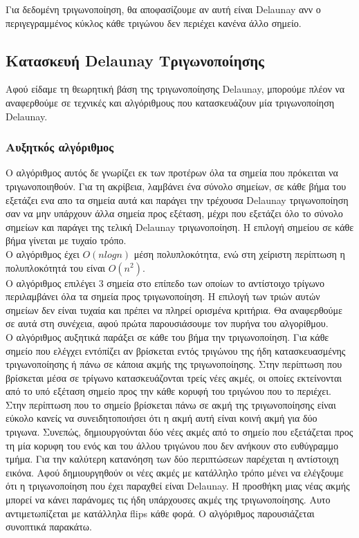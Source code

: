 \documentclass[oneside,12pt]{book}
\theoremstyle{definition}
\begin{document}
Για δεδομένη τριγωνοποίηση, θα αποφασίζουμε αν αυτή είναι Delaunay ανν ο περιγεγραμμένος κύκλος κάθε τριγώνου δεν περιέχει κανένα άλλο σημείο. \\

\subsection{Κατασκευή Delaunay Τριγωνοποίησης}

Αφού είδαμε τη θεωρητική βάση της τριγωνοποίησης Delaunay, μπορούμε πλέον να αναφερθούμε σε τεχνικές και αλγόριθμους που κατασκευάζουν μία τριγωνοποίηση Delaunay. \\

\subsubsection{Αυξητκός αλγόριθμος}

Ο αλγόριθμος αυτός δε γνωρίζει εκ των προτέρων όλα τα σημεία που πρόκειται να τριγωνοποιηθούν. Για τη ακρίβεια, λαμβάνει ένα σύνολο σημείων, σε κάθε βήμα του εξετάζει ενα απο τα σημεία αυτά και παράγει την τρέχουσα Delaunay τριγωνοποίηση σαν να μην υπάρχουν άλλα σημεία προς εξέταση, μέχρι που εξετάζει όλο το σύνολο σημείων και παράγει της τελική Delaunay τριγωνοποίηση. Η επιλογή σημείου σε κάθε βήμα γίνεται με τυχαίο τρόπο. \\

Ο αλγόριθμος έχει \(Ο(n logn)\) μέση πολυπλοκότητα, ενώ στη χείριστη περίπτωση η πολυπλοκότητά του είναι \(O(n^2)\). \\

Ο αλγόριθμος επιλέγει 3 σημεία στο επίπεδο των οποίων το αντίστοιχο τρίγωνο περιλαμβάνει όλα τα σημεία προς τριγωνοποίηση. Η επιλογή των τριών αυτών σημείων δεν είναι τυχαία και πρέπει να πληρεί ορισμένα κριτήρια. Θα αναφερθούμε σε αυτά στη συνέχεια, αφού πρώτα παρουσιάσουμε τον πυρήνα του αλγορίθμου. \\

Ο αλγόριθμος αυξητικά παράξει σε κάθε του βήμα την τριγωνοποίηση. Για κάθε σημείο που ελέγχει εντόπίζει αν βρίσκεται εντός τριγώνου της ήδη κατασκευασμένης τριγωνοποίησης ή πάνω σε κάποια ακμής της τριγωνοποίησης. Στην περίπτωση που βρίσκεται μέσα σε τρίγωνο κατασκευάζονται τρείς νέες ακμές, οι οποίες εκτείνονται από το υπό εξέταση σημείο προς την κάθε κορυφή του τριγώνου που το περιέχει. Στην περίπτωση που το σημείο βρίσκεται πάνω σε ακμή της τριγωνοποίησης είναι εύκολο κανείς να συνειδητοποιήσει ότι η ακμή αυτή είναι κοινή ακμή για δύο τριγωνα. Συνεπώς, δημιουργούνται δύο νέες ακμές από το σημείο που εξετάζεται προς τη μία κορυφη του ενός και του άλλου τριγώνου που δεν ανήκουν στο ευθύγραμμο τμήμα. Για την καλύτερη κατανόηση των δύο περιπτώσεων παρέχεται η αντίστοιχη εικόνα. Αφού δημιουργηθούν οι νέες ακμές με κατάλληλο τρόπο μένει να ελέγξουμε ότι η τριγωνοποίηση που έχει παραχθεί είναι Delaunay. Η προσθήκη μιας νέας ακμής μπορεί να κάνει παράνομες τις ήδη υπάρχουσες ακμές της τριγωνοποίησης. Αυτο αντιμετωπίζεται με κατάλληλα flips κάθε φορά. Ο αλγόριθμος παρουσιάζεται συνοπτικά παρακάτω. \\
\end{document}
